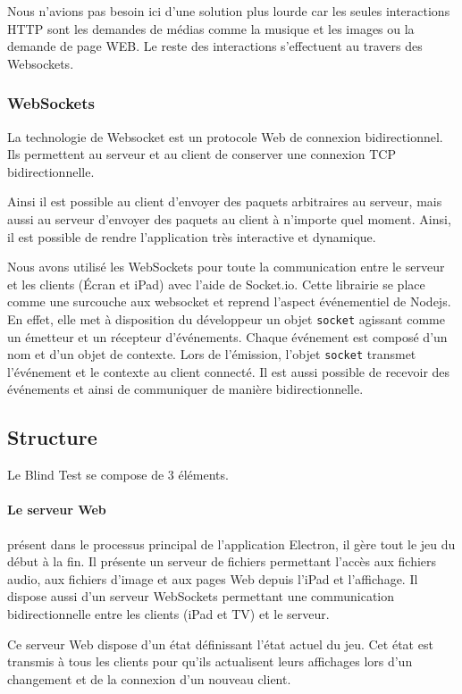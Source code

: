 Nous n'avions pas besoin ici d'une solution plus lourde car les seules interactions HTTP sont les demandes de médias comme la musique et les images ou la demande de page WEB.
Le reste des interactions s'effectuent au travers des Websockets.

\subsubsection{WebSockets}

La technologie de Websocket est un protocole Web de connexion bidirectionnel.
Ils permettent au serveur et au client de conserver une connexion TCP bidirectionnelle.

Ainsi il est possible au client d'envoyer des paquets arbitraires au serveur, mais aussi au serveur d'envoyer des paquets au client à n'importe quel moment.
Ainsi, il est possible de rendre l'application très interactive et dynamique.

Nous avons utilisé les WebSockets pour toute la communication entre le serveur et les clients (Écran et iPad) avec l'aide de Socket.io.
Cette librairie se place comme une surcouche aux websocket et reprend l'aspect événementiel de Nodejs.
En effet, elle met à disposition du développeur un objet \texttt{socket} agissant comme un émetteur et un récepteur d'événements.
Chaque événement est composé d'un nom et d'un objet de contexte.
Lors de l'émission, l'objet \texttt{socket} transmet l'événement et le contexte au client connecté.
Il est aussi possible de recevoir des événements et ainsi de communiquer de manière bidirectionnelle.

\subsection{Structure}

Le Blind Test se compose de 3 éléments.

\paragraph{Le serveur Web} présent dans le processus principal de l'application Electron, il gère tout le jeu du début à la fin.
Il présente un serveur de fichiers permettant l'accès aux fichiers audio, aux fichiers d'image et aux pages Web depuis l'iPad et l'affichage.
Il dispose aussi d'un serveur WebSockets permettant une communication bidirectionnelle entre les clients (iPad et TV) et le serveur.

Ce serveur Web dispose d'un état définissant l'état actuel du jeu.
Cet état est transmis à tous les clients pour qu'ils actualisent leurs affichages lors d'un changement et de la connexion d'un nouveau client.

